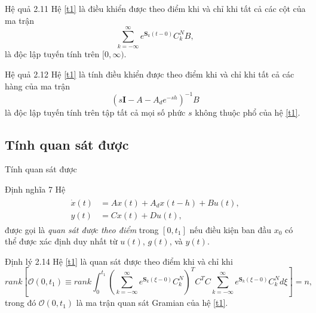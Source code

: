 \documentclass[10pt,notheorems]{beamer}
\theoremstyle{definition}
\theoremstyle{definition}
\theoremstyle{definition}
\begin{document}
%
\begin{frame}{}	
		\begin{block}{Hệ quả 2.11}
			Hệ \eqref{t1} là điều khiển được theo điểm khi và chỉ khi tất cả các cột của ma trận
			\begin{equation}\label{t13}
			\sum\limits^\infty_{k=-\infty}e^{\mathbf{S}_k(t-0)}C^N_kB,
			\end{equation}
			là độc lập tuyến tính trên $[0,\infty)$.
		\end{block}
		\begin{block}{Hệ quả 2.12}        
			Hệ \eqref{t1} là tính điều khiển được theo điểm khi và chỉ khi tất cả các hàng của ma trận
			\begin{equation}\label{t15}
			(s\mathbf{I}-A-A_de^{-sh})^{-1}B 
			\end{equation} 	  
			là độc lập tuyến tính trên tập tất cả mọi số phức $s$ không thuộc phổ của hệ \eqref{t1}.
		\end{block}	 
\end{frame}

\subsection{Tính quan sát được}

\begin{frame}{Tính quan sát được}
	\begin{block}{Định nghĩa 7}
		Hệ 
		\begin{align*}
		\begin{split}
		\dot{x}(t)&=Ax(t)+A_dx(t-h)+Bu(t), \\
		y(t)&=Cx(t)+Du(t),
		\end{split}
		\end{align*}
	được gọi là {\it quan sát được theo điểm} trong $[0, t_1]$ nếu điều kiện ban đầu $x_0$ có thể được xác định duy nhất từ $u(t)$, $g(t)$, và $y(t)$.
	\end{block}
	\begin{block}{Định lý 2.14}
		Hệ \eqref{t1} là quan sát được theo điểm khi và chỉ khi
		\begin{equation}\label{t16}
		rank\left[\mathcal{O}(0,t_1)\equiv rank\int^{t_1}_0\left(\sum\limits^\infty_{k=-\infty}e^{\mathbf{S}_k(\xi -0)}C^N_k\right)^TC^TC\sum\limits^\infty_{k=-\infty}e^{\mathbf{S}_k(\xi -0)}C^N_kd\xi \right]=n,
		\end{equation}\pause
		trong đó $\mathcal{O}(0,t_1)$ là ma trận quan sát Gramian của hệ \eqref{t1}.
	\end{block}
\end{frame}
\end{document}
